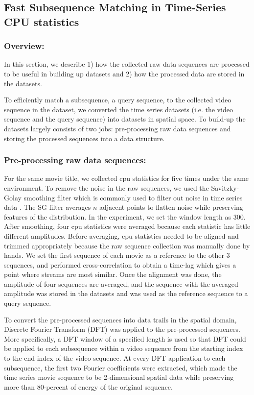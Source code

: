 \subsection{Fast Subsequence Matching in Time-Series CPU statistics}
\label{sec:kookjin}

\subsubsection{Overview:}
In this section, we describe 1) how the collected raw data sequences are processed to be useful in building up datasets and 2) how the processed data are stored in the datasets.

To efficiently match a subsequence, a query sequence, to the collected video sequence in the dataset, we converted the time series datasets (i.e. the video sequence and the query sequence) into datasets in spatial space. To build-up the datasets largely consists of two jobs: pre-processing raw data sequences and storing the processed sequences into a data structure.

\subsubsection{Pre-processing raw data sequences:}
For the same movie title, we collected cpu statistics for five times under the same environment. To remove the noise in the raw sequences, we used the Savitzky-Golay smoothing filter which is commonly used to filter out noise in time series data \cite{SGfilter}. The SG filter averages $n$ adjacent points to flatten noise while preserving features of the distribution. In the experiment, we set the window length as 300. After smoothing, four cpu statistics were averaged because each statistic has little different amplitudes. Before averaging, cpu statistics needed to be aligned and trimmed appropriately because the raw sequence collection was manually done by hands. We set the first sequence of each movie as a reference to the other 3 sequences, and performed cross-correlation to obtain a time-lag which gives a point where streams are most similar. Once the alignment was done, the amplitude of four sequences are averaged, and the sequence with the averaged amplitude was stored in the datasets and was used as the reference sequence to a query sequence.

To convert the pre-processed sequences into data trails in the spatial domain, Discrete Fourier Transform (DFT) was applied to the pre-processed sequences. More specifically, a  DFT window of a specified length is used so that DFT could be applied to each subsequence within a video sequence from the starting index to the end index of the video sequence. At every DFT application to each subsequence, the first two Fourier coefficients were extracted, which made the time series movie sequence to be 2-dimensional spatial data while preserving more than 80-percent of energy of the original sequence.

